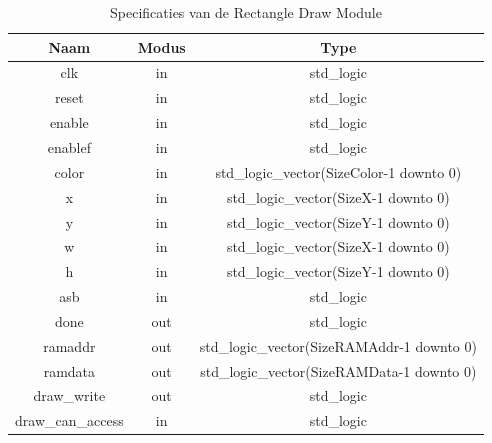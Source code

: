 \documentclass{scrartcl} %
\begin{document}
\begin{table}[H]
\centering
\caption{Specificaties van de Rectangle Draw Module}
\label{tab:spec-rect-draw}
\begin{tabular}{c c c}
	\hline\hline
 	Naam & Modus & Type\\
 	\hline	
	clk & in & std\_logic \\
	reset & in & std\_logic \\
	enable& in & std\_logic \\
	enablef& in & std\_logic \\
	color & in & std\_logic\_vector(SizeColor-1 downto 0) \\
	x & in & std\_logic\_vector(SizeX-1 downto 0) \\
	y & in & std\_logic\_vector(SizeY-1 downto 0) \\
	w & in & std\_logic\_vector(SizeX-1 downto 0) \\
	h & in & std\_logic\_vector(SizeY-1 downto 0) \\
	asb & in & std\_logic \\
	done & out & std\_logic \\
	ramaddr &out & std\_logic\_vector(SizeRAMAddr-1 downto 0) \\
	ramdata &out & std\_logic\_vector(SizeRAMData-1 downto 0) \\
	draw\_write &out & std\_logic \\
	draw\_can\_access & in & std\_logic \\
  	\hline
\end{tabular}
\end{table}
\end{document}
